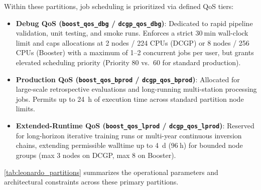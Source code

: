 Within these partitions, job scheduling is prioritized via defined QoS tiers:
\begin{itemize}
  \item \textbf{Debug QoS (\texttt{boost\_qos\_dbg} /
    \texttt{dcgp\_qos\_dbg})}: Dedicated to rapid pipeline validation, unit
    testing, and smoke runs. Enforces a strict $\qty{30}{\minute}$ wall-clock
    limit and caps allocations at \num{2} nodes / \num{224}
    \acp{CPU} (\ac{DCGP}) or \num{8}
    nodes / \num{256} \acp{CPU} (Booster) with a maximum of
    \numrange{1}{2} concurrent jobs per
    user, but grants elevated scheduling priority (Priority \num{80}
      vs.~\num{60} for
    standard production).
  \item \textbf{Production QoS (\texttt{boost\_qos\_bprod} /
    \texttt{dcgp\_qos\_bprod})}: Allocated for large-scale retrospective
    evaluations and long-running multi-station processing jobs. Permits up to
    \qty{24}{\hour} of execution time across standard partition node limits.
  \item \textbf{Extended-Runtime QoS (\texttt{boost\_qos\_lprod} /
    \texttt{dcgp\_qos\_lprod})}: Reserved for long-horizon iterative training
    runs or multi-year continuous inversion chains, extending permissible
    walltime up to \qty{4}{\day} ($\qty{96}{\hour}$) for bounded node
    groups (max \num{3} nodes on \ac{DCGP}, max \num{8} on Booster).
\end{itemize}

\cref{tab:leonardo_partitions} summarizes the operational parameters
and architectural constraints across these primary partitions.

